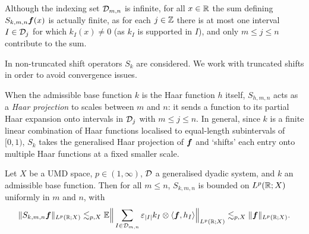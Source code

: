 Although the indexing set $\mathcal{D}_{m,n}$ is infinite, for all $x \in \mathbb{R}$ the sum defining $S_{k,m,n}\bm{f}(x)$ is actually finite, as for each $j \in \mathbb{Z}$ there is at most one interval $I \in \mathcal{D}_{j}$ for which $k_{I}(x) \neq 0$ (as $k_{I}$ is supported in $I$), and only $m \leq j \leq n$ contribute to the sum.

\begin{rmk}
  In \cite{HNVW16} non-truncated shift operators $S_{k}$ are considered.
  We work with truncated shifts in order to avoid convergence issues.
\end{rmk}

When the admissible base function $k$ is the Haar function $h$ itself, $S_{h, m,n}$ acts as a \emph{Haar projection} to scales between $m$ and $n$: it sends a function to its partial Haar expansion onto intervals in $\mathcal{D}_{j}$ with $m \leq j \leq n$.
In general, since $k$ is a finite linear combination of Haar functions localised to equal-length subintervals of $[0,1)$, $S_{k}$ takes the generalised Haar projection of $\bm{f}$ and `shifts' each entry onto multiple Haar functions at a fixed smaller scale.

\begin{thm}\label{eq:shift-boundedness}
  Let $X$ be a UMD space, $p \in (1,\infty)$, $\mathcal{D}$ a generalised dyadic system, and $k$ an admissible base function.
  Then for all $m \leq n$, $S_{k,m,n}$ is bounded on $L^{p}(\mathbb{R};X)$ uniformly in $m$ and $n$,
  with
  \begin{equation*}
    \|S_{k,m,n} \bm{f}\|_{L^p(\mathbb{R};X)} \lesssim_{p,X} \mathbb{E} \Big\| \sum_{I \in \mathcal{D}_{m,n}} \varepsilon_{|I|} k_{I} \otimes \langle \bm{f}, h_{I} \rangle \Big\|_{L^p(\mathbb{R};X)} \lesssim_{p,X} \|\bm{f}\|_{L^p(\mathbb{R};X)}.
  \end{equation*}
\end{thm}

